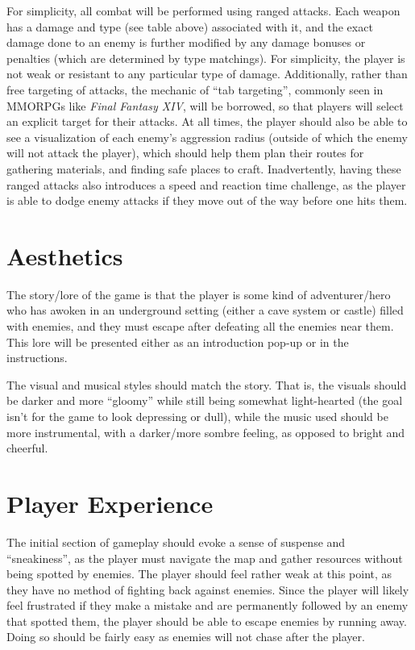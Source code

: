 \documentclass[10pt]{article}
\begin{document}
For simplicity, all combat will be performed using ranged attacks. Each weapon has a damage and type (see table above)
associated with it, and the exact damage done to an enemy is further modified by any damage bonuses or penalties
(which are determined by type matchings). For simplicity, the player is not weak or resistant to any particular type of damage.
Additionally, rather than free targeting of attacks, the mechanic of ``tab targeting'', commonly seen in MMORPGs like \textit{Final Fantasy XIV},
will be borrowed, so that players will select an explicit target for their attacks. At all times, the player should also be able
to see a visualization of each enemy's aggression radius (outside of which the enemy will not attack the player),
which should help them plan their routes for gathering materials, and finding safe places to craft.
Inadvertently, having these ranged attacks also introduces a speed and reaction time challenge, as the player is able
to dodge enemy attacks if they move out of the way before one hits them.

\section{Aesthetics}

The story/lore of the game is that the player is some kind of adventurer/hero who has awoken in an underground setting (either a cave system
or castle) filled with enemies, and they must escape after defeating all the enemies near them. This lore will be presented
either as an introduction pop-up or in the instructions.

The visual and musical styles should match the story. That is, the visuals should be darker and more ``gloomy'' while still
being somewhat light-hearted (the goal isn't for the game to look depressing or dull), while the music used should be more
instrumental, with a darker/more sombre feeling, as opposed to bright and cheerful.

\section{Player Experience}

The initial section of gameplay should evoke a sense of suspense and ``sneakiness'', as the player must navigate the map
and gather resources without being spotted by enemies. The player should feel rather weak at this point, as they have no
method of fighting back against enemies. Since the player will likely feel frustrated if they make a mistake and are permanently
followed by an enemy that spotted them, the player should be able to escape enemies by running away. Doing so should be fairly easy
as enemies will not chase after the player.
\end{document}
